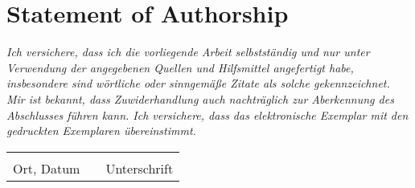 \vspace*{\fill}
\noindent

\hypertarget{statement}{%
\chapter*{Statement of Authorship}\label{statement}}

\textit{Ich versichere, dass ich die vorliegende Arbeit selbstständig und nur unter Verwendung der angegebenen Quellen und Hilfsmittel angefertigt habe, insbesondere sind wörtliche oder sinngemäße Zitate als solche gekennzeichnet. Mir ist bekannt, dass Zuwiderhandlung auch nachträglich zur Aberkennung des Abschlusses führen kann. Ich versichere, dass das elektronische Exemplar mit den gedruckten Exemplaren übereinstimmt.}

\vspace*{3cm}

\begin{tabular}{lp{2em}l} 
 \hspace{5cm} && \hspace{5cm} \\ \cline{1-1} \cline{3-3}
 \rule{0pt}{3.5ex} Ort, Datum && Unterschrift 
\end{tabular}

\vspace*{\fill}
